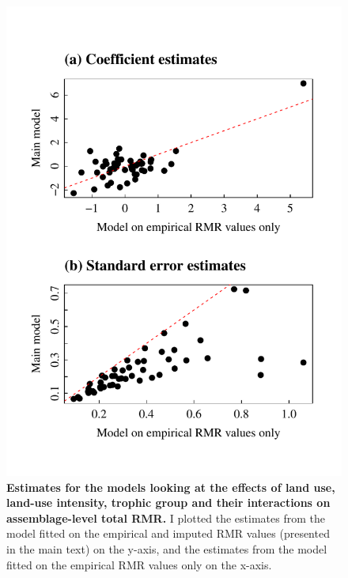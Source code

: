 \begin{figure}[h!]
\centering
\includegraphics[scale=0.7]{Supporting/Chapter5/Figures/tRMR_coefs_complete_VS_imputed}
\caption[Estimates for the models looking at the effects of land use, land-use intensity, trophic group and their interactions on assemblage-level total RMR]{\textbf{Estimates for the models looking at the effects of land use, land-use intensity, trophic group and their interactions on assemblage-level total RMR.} I plotted the estimates from the model fitted on the empirical and imputed RMR values (presented in the main text) on the y-axis, and the estimates from the model fitted on the empirical RMR values only on the x-axis.}
\label{SI5_figure4}
\end{figure}


